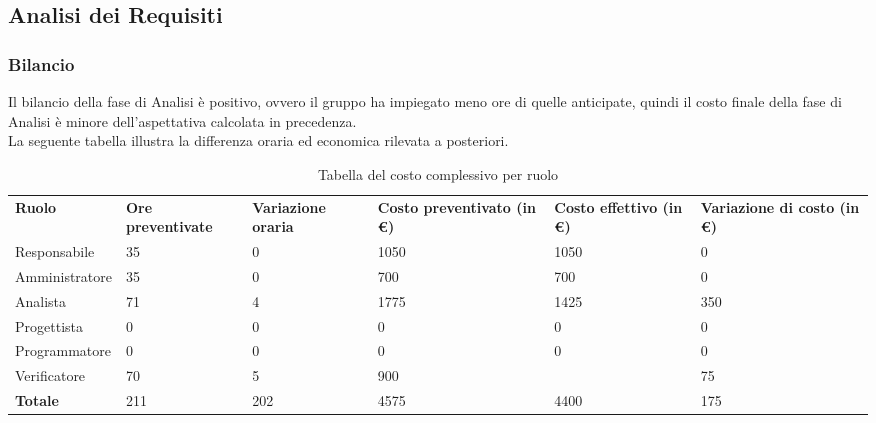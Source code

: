\subsection{Analisi dei Requisiti}
\subsubsection{Bilancio}
Il bilancio della fase di Analisi è positivo, ovvero il gruppo ha impiegato meno ore di quelle anticipate, quindi il costo finale della fase di Analisi è minore dell'aspettativa calcolata in precedenza.\\
La seguente tabella illustra la differenza oraria ed economica rilevata a posteriori.

{
\renewcommand{\arraystretch}{2}
\begin{longtable}[h]{ C{2.5cm} C{2.5cm} C{2.5cm} C{2.5cm} C{1.5cm} C{2.5cm}}
\caption{Tabella del costo complessivo per ruolo}\\
\rowcolor{\primaryColor}

\textcolor{\secondaryColor}{\textbf{Ruolo}} & 
\textcolor{\secondaryColor}{\textbf{Ore preventivate}} & 
\textcolor{\secondaryColor}{\textbf{Variazione oraria}} & 
\textcolor{\secondaryColor}{\textbf{Costo preventivato (in \euro{})}} & 
\textcolor{\secondaryColor}{\textbf{Costo effettivo (in \euro{})}} & 
\textcolor{\secondaryColor}{\textbf{Variazione di costo (in \euro{})}}\\	
	
Responsabile    &  35 & 0 & 1050 & 1050 &  0 \\
Amministratore  &  35 & 0 & 700 & 700 & 0 \\
Analista        & 71 & 4 & 1775 & 1425 & 350 \\
Progettista     &   0 &   0 &    0 &  0 & 0 \\
Programmatore   &   0 &   0 &    0 &  0 & 0 \\
Verificatore    &  70 &  5 & 900 &  & 75 \\
\textbf{Totale} & 211 & 202 & 4575 & 4400 & 175 \\	

\end{longtable}
}

